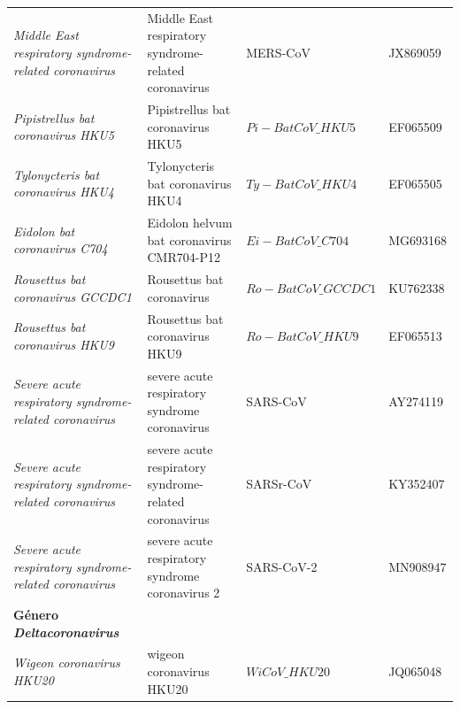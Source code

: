 \begin{table}[H]
\begin{tabularx}{\textwidth}{@{}>{\raggedright\arraybackslash}p{4cm}>{\raggedright\arraybackslash}p{4.5cm}>{\raggedright\arraybackslash}p{3cm}>{\raggedright\arraybackslash}X@{}}
    \textit{Middle East respiratory syndrome-related coronavirus}   & Middle East respiratory syndrome-related coronavirus & MERS-CoV                                      &  JX869059             \\
    \textit{Pipistrellus bat coronavirus HKU5}                      & Pipistrellus bat coronavirus HKU5                    & $Pi-BatCoV\_{HKU5}$                           &  EF065509             \\
    \textit{Tylonycteris bat coronavirus HKU4}                      & Tylonycteris bat coronavirus HKU4                    & $Ty-BatCoV\_{HKU4}$                           &  EF065505             \\
    \textit{Eidolon bat coronavirus C704}                           & Eidolon helvum bat coronavirus CMR704-P12            & $Ei-BatCoV\_{C704}$                           &  MG693168             \\
    \textit{Rousettus bat coronavirus GCCDC1}                       & Rousettus bat coronavirus                            & $Ro-BatCoV\_{GCCDC1}$                         &  KU762338             \\
    \textit{Rousettus bat coronavirus HKU9}                         & Rousettus bat coronavirus HKU9                       & $Ro-BatCoV\_{HKU9}$                           &  EF065513             \\
    \textit{Severe acute respiratory syndrome-related coronavirus}  & severe acute respiratory syndrome coronavirus        & SARS-CoV                                      &  AY274119             \\
    \textit{Severe acute respiratory syndrome-related coronavirus}  & severe acute respiratory syndrome-related coronavirus & SARSr-CoV                                    &  KY352407             \\
    \textit{Severe acute respiratory syndrome-related coronavirus}  & severe acute respiratory syndrome coronavirus 2      & SARS-CoV-2                                    &  MN908947             \\ \midrule
    \textbf{Género \textit{Deltacoronavirus}}                                                                                                                                                      \\ \midrule
    \textit{Wigeon coronavirus HKU20}                               & wigeon coronavirus HKU20                             & $WiCoV\_{HKU20}$                              &  JQ065048             \\

\end{tabularx}
\end{table}
